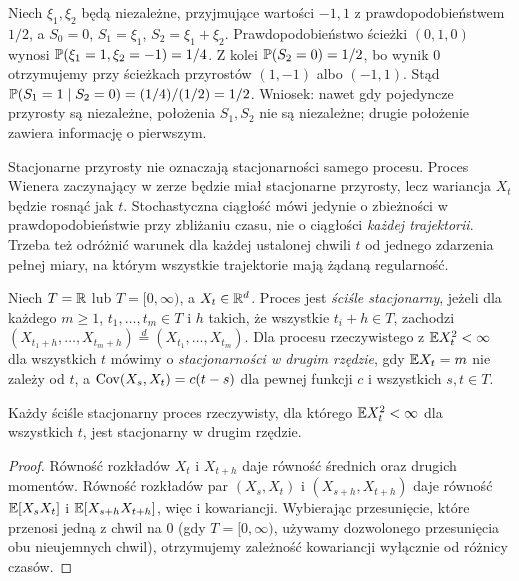 \begin{przyklad}
Niech $\xi_1,\xi_2$ będą niezależne, przyjmujące
wartości $-1,1$ z prawdopodobieństwem $1/2$,
a $S_0=0$, $S_1=\xi_1$, $S_2=\xi_1+\xi_2$.
Prawdopodobieństwo ścieżki $(0,1,0)$ wynosi
$\mathbb{P}(\xi_1=1,\xi_2=-1)=1/4$.
Z kolei $\mathbb{P}(S_2=0)=1/2$, bo wynik $0$ otrzymujemy
przy ścieżkach przyrostów $(1,-1)$ albo $(-1,1)$.
Stąd $\mathbb{P}(S_1=1\mid S_2=0)=(1/4)/(1/2)=1/2$.
Wniosek: nawet gdy pojedyncze przyrosty są niezależne,
położenia $S_1,S_2$ nie są niezależne; drugie położenie
zawiera informację o pierwszym.
\end{przyklad}

\begin{uwaga}
Stacjonarne przyrosty nie oznaczają stacjonarności samego procesu.
Proces Wienera zaczynający w zerze będzie miał stacjonarne
przyrosty, lecz wariancja $X_t$ będzie rosnąć jak $t$.
Stochastyczna ciągłość mówi jedynie o zbieżności w prawdopodobieństwie
przy zbliżaniu czasu, nie o ciągłości \emph{każdej trajektorii}.
Trzeba też odróżnić warunek dla każdej ustalonej chwili $t$
od jednego zdarzenia pełnej miary, na którym wszystkie trajektorie
mają żądaną regularność.
\end{uwaga}

\begin{definicja}
Niech $T=\mathbb{R}$ lub $T=[0,\infty)$, a $X_t\in\mathbb{R}^d$.
Proces jest \emph{ściśle stacjonarny}, jeżeli dla każdego
$m\ge1$, $t_1,\ldots,t_m\in T$ i $h$ takich, że wszystkie
$t_i+h\in T$, zachodzi
$(X_{t_1+h},\ldots,X_{t_m+h})\overset{d}= (X_{t_1},\ldots,X_{t_m})$.
Dla procesu rzeczywistego z $\mathbb{E} X_t^2<\infty$ dla wszystkich $t$
mówimy o \emph{stacjonarności w drugim rzędzie}, gdy
$\mathbb{E} X_t=m$ nie zależy od $t$, a $\operatorname{Cov}(X_s,X_t)=c(t-s)$
dla pewnej funkcji $c$ i wszystkich $s,t\in T$.
\end{definicja}

\begin{twierdzenie}
Każdy ściśle stacjonarny proces rzeczywisty,
dla którego $\mathbb{E} X_t^2<\infty$ dla wszystkich $t$,
jest stacjonarny w drugim rzędzie.
\end{twierdzenie}
\begin{proof}
Równość rozkładów $X_t$ i $X_{t+h}$ daje równość średnich
oraz drugich momentów. Równość rozkładów par
$(X_s,X_t)$ i $(X_{s+h},X_{t+h})$ daje równość
$\mathbb{E}[X_sX_t]$ i $\mathbb{E}[X_{s+h}X_{t+h}]$, więc i kowariancji.
Wybierając przesunięcie, które przenosi jedną z chwil na $0$
(gdy $T=[0,\infty)$, używamy dozwolonego przesunięcia
obu nieujemnych chwil), otrzymujemy zależność kowariancji
wyłącznie od różnicy czasów.
\end{proof}


